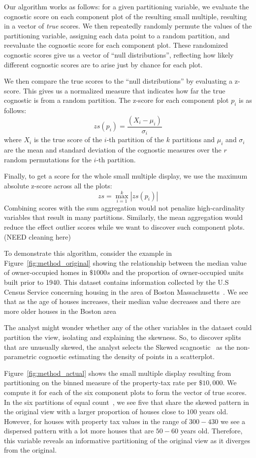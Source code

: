 Our algorithm works as follows: for a given partitioning variable, we evaluate the cognostic score on each component plot of the resulting small multiple, resulting in a vector of \emph{true} scores. We then repeatedly randomly permute the values of the partitioning variable, assigning each data point to a random partition, and reevaluate the cognostic score for each component plot. These randomized cognostic scores give us a vector of ``null distributions'', reflecting how likely different cognostic scores are to arise just by chance for each plot.

We then compare the true scores to the ``null distributions'' by evaluating a z-score. This gives us a normalized measure that indicates how far the true cognostic is from a random partition. The z-score for each component plot $p_i$ is as follows:
$$zs(p_i) = \frac{(X_i-\mu_i)}{\sigma_i}$$ 
where $X_i$ is the true score of the $i$-th partition of the $k$ partitions and $\mu_i$ and $\sigma_i$ are the mean and standard deviation of the cognostic measures over the $r$ random permutations for the $i$-th partition.

Finally, to get a score for the whole small multiple display, we use the maximum absolute z-score across all the plots: 
$$zs = \max_{i=1}^k |zs(p_i)|$$ 
Combining scores with the sum aggregation would not penalize high-cardinality variables that result in many partitions. Similarly, the mean aggregation would reduce the effect outlier scores while we want to discover such component plots. (NEED cleaning here)

To demonstrate this algorithm, consider the example in Figure~\ref{fig:method_original} showing the relationship between the median value of owner-occupied homes in $\$1000s$ and the proportion of owner-occupied units built prior to 1940. This dataset contains information collected by the U.S Census Service concerning housing in the area of Boston Massachusetts~\cite{Harrison1978}. We see that as the age of houses increases, their median value decreases and there are more older houses in the Boston area

The analyst might wonder whether any of the other variables in the dataset could partition the view, isolating and explaining the skewness. So, to discover splits that are unusually skewed, the analyst selects the Skewed scagnostic~\cite{Wilkinson2005} as the non-parametric cognostic estimating the density of points in a scatterplot. 

Figure~\ref{fig:method_actual} shows the small multiple display resulting from partitioning on the binned measure of the property-tax rate per $\$10,000$. We compute it for each of the six component plots to form the vector of true scores. In the six partitions of equal count~\cite{Becker1996}, we see five that share the skewed pattern in the original view with a larger proportion of houses close to $100$ years old. However, for houses with property tax values in the range of $300-430$ we see a dispersed pattern with a lot more houses that are $50-60$ years old. Therefore, this variable reveals an informative partitioning of the original view as it diverges from the original.

